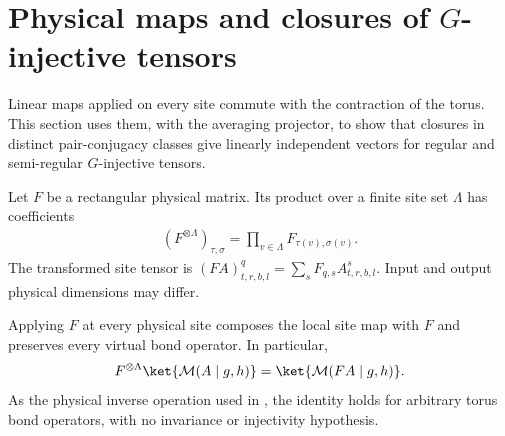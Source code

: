 \section{Physical maps and closures of \texorpdfstring{$G$}{G}-injective tensors}%
\label{sec:peps_closure_physical_maps}

Linear maps applied on every site commute with the contraction of the torus.
This section uses them, with the averaging projector, to show that closures in
distinct pair-conjugacy classes give linearly independent vectors for regular
and semi-regular $G$-injective tensors.

\begin{definition}%
    \label{def:peps_physical_product_map}
    \leanok
    Let $F$ be a rectangular physical matrix. Its product over a finite
    site set $\Lambda$ has coefficients
    \begin{align}
        (F^{\otimes\Lambda})_{\tau,\sigma}
        =\prod_{v\in\Lambda}F_{\tau(v),\sigma(v)}.
    \end{align}
    The transformed site tensor is
    $(FA)^q_{t,r,b,l}=\sum_s F_{q,s}A^s_{t,r,b,l}$.
    Input and output physical dimensions may differ.
\end{definition}

\begin{lemma}%
    \label{thm:peps_torus_physical_map_contraction}
    \leanok
    Applying $F$ at every physical site composes the local site map
    with $F$ and preserves every virtual bond operator. In particular,
    \begin{align}
        F^{\otimes\Lambda}\ket{\mathcal M(A\mid g,h)}
        =\ket{\mathcal M(FA\mid g,h)}.
    \end{align}
    As the physical inverse
    operation used in \cite[Theorem~5.9]{Schuch2010PEPS}, the identity holds for arbitrary torus bond operators, with no
    invariance or injectivity hypothesis.
\end{lemma}

